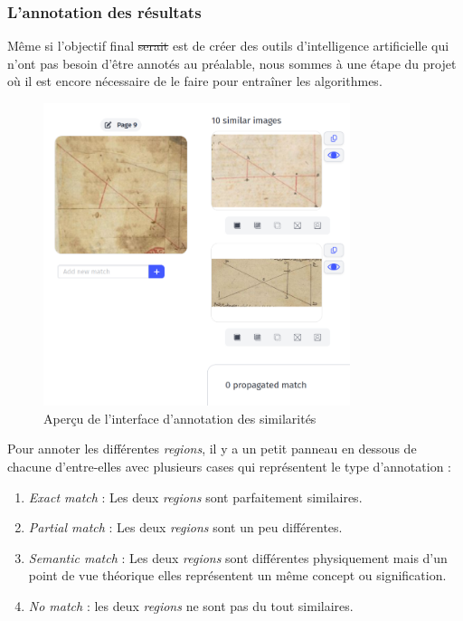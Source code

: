 
\subsubsection{L'annotation des résultats}


Même si l'objectif final \st{serait} est  de créer des outils d'intelligence artificielle qui n'ont pas besoin d'être annotés au préalable, nous sommes à une étape du projet où il est encore nécessaire de le faire pour entraîner les algorithmes. 

\begin{figure}[H]
	\centering
	\includegraphics[width=0.8\textwidth]{images/annotation_similarities.png}
	\caption{Aperçu de l'interface d'annotation des similarités}
	\label{fig:annotations_similarites}
\end{figure}

Pour annoter les différentes \textit{regions}, il y a un petit panneau en dessous de chacune d'entre-elles avec plusieurs cases qui représentent le type d'annotation : 
\begin{enumerate}
	\item \textit{Exact match} : Les deux \textit{regions} sont parfaitement similaires.
	\item \textit{Partial match} : Les deux \textit{regions} sont un peu différentes.
	\item \textit{Semantic match} : Les deux \textit{regions} sont différentes physiquement mais d'un point de vue théorique elles représentent un même concept ou signification.
	\item \textit{No match} : les deux \textit{regions} ne sont pas du tout similaires.
\end{enumerate} 


